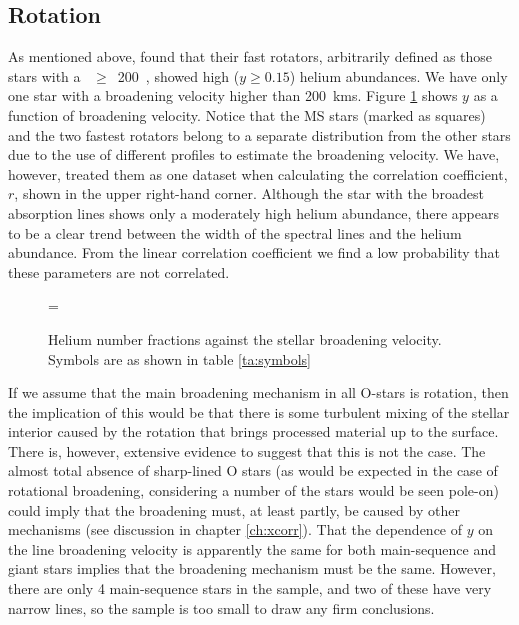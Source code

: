 \subsection{Rotation}
\label{sec:odiscuss:rotation}
As mentioned above,  found that their fast rotators,
arbitrarily defined as those stars with a \vsini~$\geq$~200~\kms,
showed high ($y \geq 0.15$) helium abundances. We have only one star
with a broadening velocity higher than 200~kms. Figure
\ref{fig:helium:vsini} shows $y$ as a function of broadening
velocity. Notice that the MS stars (marked as squares) and the two
fastest rotators belong to a separate distribution from the other
stars due to the use of different profiles to estimate the broadening
velocity. We have, however, treated them as one dataset when calculating
the correlation coefficient, $r$, shown in the upper right-hand
corner. Although the star with the broadest absorption lines shows only a
moderately high helium abundance, there appears to be a clear trend
between the width of the spectral lines and the helium abundance. From
the linear correlation coefficient we find a low probability
that these parameters are not correlated.

\begin{figure} %
\epsfxsize=\figwidth
\setlength{\cen}{(\textwidth / 2) - (\epsfxsize / 2)}
\hspace{\cen}
\caption[Helium fractions against broadening velocity]
{\fcfont Helium number fractions against the stellar broadening
velocity. Symbols are as shown in table \ref{ta:symbols}}
\label{fig:helium:vsini}
\end{figure}   %

If we assume that the main broadening mechanism in all O-stars is
rotation, then the implication of this would be that there is some
turbulent mixing of the stellar interior caused by the rotation that
brings processed material up to the surface. There is, however,
extensive evidence to suggest that this is not the case. The almost
total absence of sharp-lined O stars (as would be expected in the case
of rotational broadening, considering a number of the stars would be
seen pole-on) could imply that the broadening must, at least partly, be
caused by other mechanisms (see discussion in chapter
\ref{ch:xcorr}). That the dependence of $y$ on the line broadening
velocity is apparently the same for both main-sequence and giant stars
implies that the broadening mechanism must be the same. However, there
are only 4 main-sequence stars in the sample, and two of these have
very narrow lines, so the sample is too small to draw any firm
conclusions.

